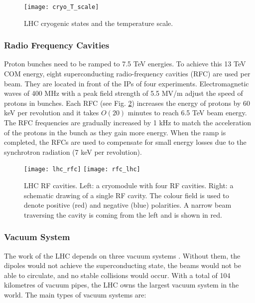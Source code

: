 \begin{normalsize}
\begin{figure}[H]
  \centering
  \texttt{[image: cryo\_T\_scale]}
  \caption{LHC cryogenic states and the temperature scale.}
  \label{cryo_T_scale}
\end{figure}




\subsubsection{Radio Frequency Cavities}\label{sec:rf}


Proton bunches need to be ramped to 7.5 TeV energies. To achieve this 13 TeV COM energy, eight superconducting radio-frequency cavities (RFC) are used per beam. They are located in front of the IPs of four experiments. Electromagnetic waves of 400 MHz with a peak field strength of 5.5 MV/m adjust the speed of protons in bunches. Each RFC (see Fig. \ref{lhc_rfc}) increases the energy of protons by 60 keV per revolution and it takes $O(20)$ minutes to reach 6.5 TeV beam energy. The RFC frequencies are gradually increased by 1 kHz to match the acceleration of the protons in the bunch as they gain more energy. When the ramp is completed, the RFCs are used to compensate for small energy losses due to the synchrotron radiation (7 keV per revolution). 



\begin{figure}[H]
\centering
\texttt{[image: lhc\_rfc]}
\texttt{[image: rfc\_lhc]}
\caption[RF cavities module.]{LHC RF cavities. Left: a cryomodule with four RF cavities. Right: a schematic drawing of a single RF cavity. The colour field is used to denote positive (red) and negative (blue) polarities. A narrow beam traversing the cavity is coming from the left and is shown in red. }
\label{lhc_rfc}
\end{figure}




\subsubsection{Vacuum System}\label{sec:vacuum}




The work of the LHC depends on three vacuum systems \cite{LHC_vacuum}. Without them, the dipoles would not achieve the superconducting state, the beams would not be able to circulate, and no stable collisions would occur. With a total of 104 kilometres of vacuum pipes, the LHC owns the largest vacuum system in the world. The main types of vacuum systems are:


\end{normalsize}

